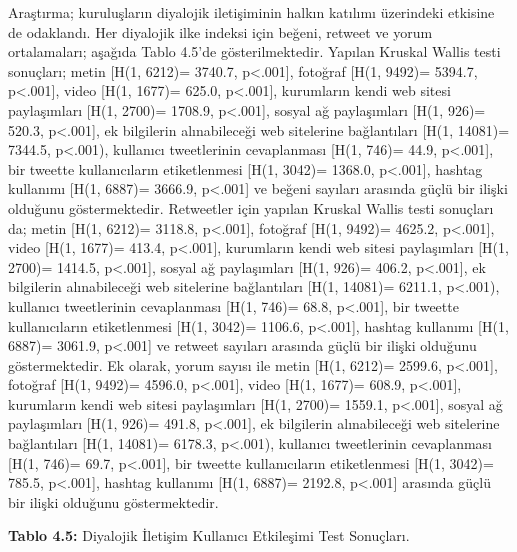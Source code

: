 \documentclass[
]{book}
\begin{document}
Araştırma; kuruluşların diyalojik iletişiminin halkın katılımı üzerindeki etkisine de odaklandı. Her diyalojik ilke indeksi için beğeni, retweet ve yorum ortalamaları; aşağıda Tablo 4.5'de gösterilmektedir. Yapılan Kruskal Wallis testi sonuçları; metin {[}H(1, 6212)= 3740.7, p\textless.001{]}, fotoğraf {[}H(1, 9492)= 5394.7, p\textless.001{]}, video {[}H(1, 1677)= 625.0, p\textless.001{]}, kurumların kendi web sitesi paylaşımları {[}H(1, 2700)= 1708.9, p\textless.001{]}, sosyal ağ paylaşımları {[}H(1, 926)= 520.3, p\textless.001{]}, ek bilgilerin alınabileceği web sitelerine bağlantıları {[}H(1, 14081)= 7344.5, p\textless.001), kullanıcı tweetlerinin cevaplanması {[}H(1, 746)= 44.9, p\textless.001{]}, bir tweette kullanıcıların etiketlenmesi {[}H(1, 3042)= 1368.0, p\textless.001{]}, hashtag kullanımı {[}H(1, 6887)= 3666.9, p\textless.001{]} ve beğeni sayıları arasında güçlü bir ilişki olduğunu göstermektedir. Retweetler için yapılan Kruskal Wallis testi sonuçları da; metin {[}H(1, 6212)= 3118.8, p\textless.001{]}, fotoğraf {[}H(1, 9492)= 4625.2, p\textless.001{]}, video {[}H(1, 1677)= 413.4, p\textless.001{]}, kurumların kendi web sitesi paylaşımları {[}H(1, 2700)= 1414.5, p\textless.001{]}, sosyal ağ paylaşımları {[}H(1, 926)= 406.2, p\textless.001{]}, ek bilgilerin alınabileceği web sitelerine bağlantıları {[}H(1, 14081)= 6211.1, p\textless.001), kullanıcı tweetlerinin cevaplanması {[}H(1, 746)= 68.8, p\textless.001{]}, bir tweette kullanıcıların etiketlenmesi {[}H(1, 3042)= 1106.6, p\textless.001{]}, hashtag kullanımı {[}H(1, 6887)= 3061.9, p\textless.001{]} ve retweet sayıları arasında güçlü bir ilişki olduğunu göstermektedir. Ek olarak, yorum sayısı ile metin {[}H(1, 6212)= 2599.6, p\textless.001{]}, fotoğraf {[}H(1, 9492)= 4596.0, p\textless.001{]}, video {[}H(1, 1677)= 608.9, p\textless.001{]}, kurumların kendi web sitesi paylaşımları {[}H(1, 2700)= 1559.1, p\textless.001{]}, sosyal ağ paylaşımları {[}H(1, 926)= 491.8, p\textless.001{]}, ek bilgilerin alınabileceği web sitelerine bağlantıları {[}H(1, 14081)= 6178.3, p\textless.001), kullanıcı tweetlerinin cevaplanması {[}H(1, 746)= 69.7, p\textless.001{]}, bir tweette kullanıcıların etiketlenmesi {[}H(1, 3042)= 785.5, p\textless.001{]}, hashtag kullanımı {[}H(1, 6887)= 2192.8, p\textless.001{]} arasında güçlü bir ilişki olduğunu göstermektedir.

\textbf{Tablo 4.5:} Diyalojik İletişim Kullanıcı Etkileşimi Test Sonuçları.
\end{document}
